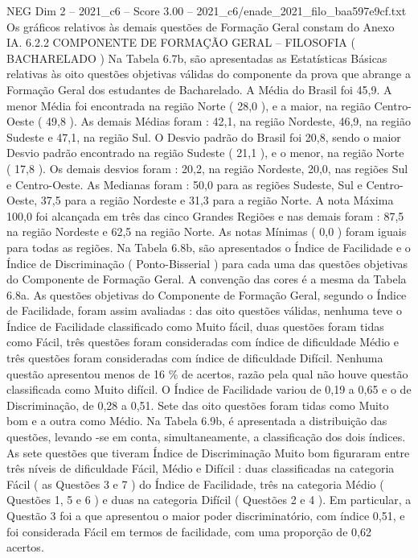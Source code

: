 \begin{textsample}{NEG Dim 2 – 2021\_c6 – Score 3.00 – 2021\_c6/enade\_2021\_filo\_baa597e9cf.txt}
Os gráficos relativos às demais questões de Formação Geral constam do Anexo IA. 6.2.2 COMPONENTE DE FORMAÇÃO GERAL – FILOSOFIA ( BACHARELADO ) Na Tabela 6.7b, são apresentadas as Estatísticas Básicas relativas às oito questões objetivas válidas do componente da prova que abrange a Formação Geral dos estudantes de Bacharelado.
A Média do Brasil foi 45,9.
A menor Média foi encontrada na região Norte ( 28,0 ), e a maior, na região Centro-Oeste ( 49,8 ).
As demais Médias foram : 42,1, na região Nordeste, 46,9, na região Sudeste e 47,1, na região Sul.
O Desvio padrão do Brasil foi 20,8, sendo o maior Desvio padrão encontrado na região Sudeste ( 21,1 ), e o menor, na região Norte ( 17,8 ).
Os demais desvios foram : 20,2, na região Nordeste, 20,0, nas regiões Sul e Centro-Oeste.
As Medianas foram : 50,0 para as regiões Sudeste, Sul e Centro-Oeste, 37,5 para a região Nordeste e 31,3 para a região Norte.
A nota Máxima 100,0 foi alcançada em três das cinco Grandes Regiões e nas demais foram : 87,5 na região Nordeste e 62,5 na região Norte.
As notas Mínimas ( 0,0 ) foram iguais para todas as regiões.
Na Tabela 6.8b, são apresentados o Índice de Facilidade e o Índice de Discriminação ( Ponto-Bisserial ) para cada uma das questões objetivas do Componente de Formação Geral.
A convenção das cores é a mesma da Tabela 6.8a.
As questões objetivas do Componente de Formação Geral, segundo o Índice de Facilidade, foram assim avaliadas : das oito questões válidas, nenhuma teve o Índice de Facilidade classificado como Muito fácil, duas questões foram tidas como Fácil, três questões foram consideradas com índice de dificuldade Médio e três questões foram consideradas com índice de dificuldade Difícil.
Nenhuma questão apresentou menos de 16 \% de acertos, razão pela qual não houve questão classificada como Muito difícil.
O Índice de Facilidade variou de 0,19 a 0,65 e o de Discriminação, de 0,28 a 0,51.
Sete das oito questões foram tidas como Muito bom e a outra como Médio.
Na Tabela 6.9b, é apresentada a distribuição das questões, levando -se em conta, simultaneamente, a classificação dos dois índices.
As sete questões que tiveram Índice de Discriminação Muito bom figuraram entre três níveis de dificuldade Fácil, Médio e Difícil : duas classificadas na categoria Fácil ( as Questões 3 e 7 ) do Índice de Facilidade, três na categoria Médio ( Questões 1, 5 e 6 ) e duas na categoria Difícil ( Questões 2 e 4 ).
Em particular, a Questão 3 foi a que apresentou o maior poder discriminatório, com índice 0,51, e foi considerada Fácil em termos de facilidade, com uma proporção de 0,62 acertos.

\end{textsample}
